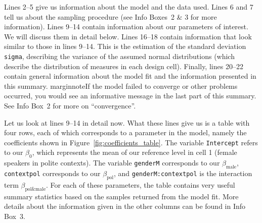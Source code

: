\documentclass[nobib]{tufte-handout}
\begin{document}
Lines 2--5 give us information about the model and the data used. Lines 6 and 7 tell us about
the sampling procedure (see Info Boxes~2 \& 3 for more information). Lines 9--14 contain information about our
parameters of interest. We will discuss them in detail below. Lines 16--18 contain information
that look similar to those in lines 9--14. This is the estimation of the standard deviation
\texttt{sigma}, describing the variance of the assumed normal distributions (which describe the
distribution of measures in each design cell). Finally, lines 20--22 contain general
information about the model fit and the information presented in this summary.
marginnote{If the model failed to converge or other problems occurred, you would see an
  informative message in the last part of this summary. See Info Box~2 for more on ``convergence''.}

Let us look at lines 9--14 in detail now. What these lines give us is a table with four rows, each of which corresponds to a parameter in the model, namely the coefficients shown in Figure~\ref{fig:coefficients_table}. The variable \texttt{Intercept} refers to our $\beta_0$, which represents the mean of our reference level in cell 1 (female speakers in polite contexts). The variable \texttt{genderM} corresponds to our $\beta_{\text{male}}$, \texttt{contextpol} corresponds to our $\beta_{\text{pol}}$, and \texttt{genderM:contextpol} is the interaction term $\beta_{\text{pol\&male}}$. For each of these parameters, the table contains very useful summary statistics based on the samples returned from the model fit.
%
%
More details about the information given in the other columns can be found in Info Box~3.
\end{document}
